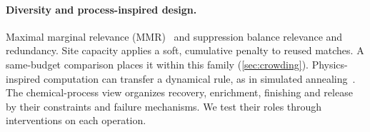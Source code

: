 \paragraph{Diversity and process-inspired design.} Maximal marginal relevance (MMR)~\cite{carbonell1998mmr} and suppression balance relevance and redundancy. Site capacity applies a soft, cumulative penalty to reused matches. A same-budget comparison places it within this family (\cref{sec:crowding}). Physics-inspired computation can transfer a dynamical rule, as in simulated annealing~\cite{kirkpatrick1983annealing}. The chemical-process view organizes recovery, enrichment, finishing and release by their constraints and failure mechanisms. We test their roles through interventions on each operation.
